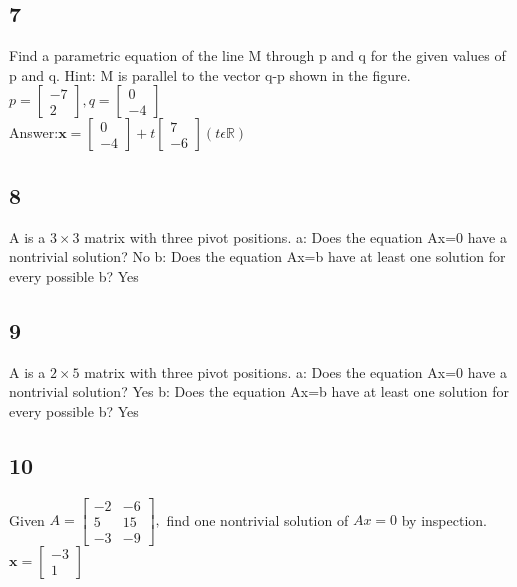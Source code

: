 \documentclass{article}
\begin{document}
\subsection*{7}
Find a parametric equation of the line M through p and q for the given values of p and q. Hint: M is parallel to the vector q-p shown in the figure.
\\$p=\begin{bmatrix}-7\\2\end{bmatrix},q=\begin{bmatrix}0\\-4\end{bmatrix}$
\\Answer:$\mathbf{x}=\begin{bmatrix}0\\-4\end{bmatrix}+t\begin{bmatrix}7\\-6\end{bmatrix}(t \epsilon \mathbb{R})$
\subsection*{8}
A is a $3\times3$ matrix with three pivot positions.
a: Does the equation Ax=0 have a nontrivial solution? No
b: Does the equation Ax=b have at least one solution for every possible b? Yes
\subsection*{9}
A is a $2\times5$ matrix with three pivot positions.
a: Does the equation Ax=0 have a nontrivial solution? Yes
b: Does the equation Ax=b have at least one solution for every possible b? Yes
\subsection*{10}
Given $A=\begin{bmatrix}-2&-6\\5&15\\-3&-9\end{bmatrix},$ find one nontrivial solution of $Ax=0$ by inspection. 
\\$\mathbf{x}=\begin{bmatrix}-3\\1\end{bmatrix}$
\end{document}
